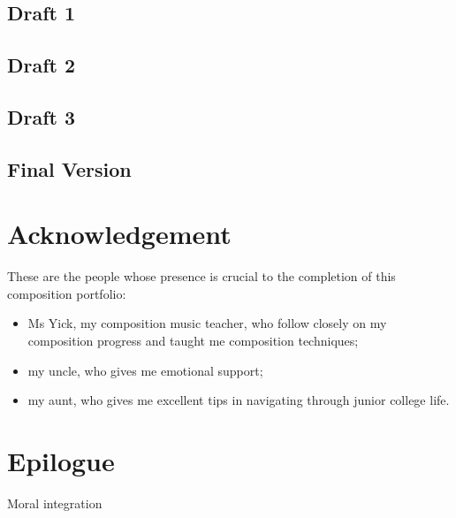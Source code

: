 \documentclass{article}
\begin{document}
\newpage
\begin{center}
\vspace*{\fill}
\LARGE
\subsection{Draft 1}
\vspace*{\fill}
%
\end{center}
\newpage
\begin{center}
\vspace*{\fill}
\LARGE
\subsection{Draft 2}
\vspace*{\fill}
%
\end{center}
\newpage
\begin{center}
\vspace*{\fill}
\LARGE
\subsection{Draft 3}
\vspace*{\fill}
%
\end{center}
\newpage
\begin{center}
\vspace*{\fill}
\LARGE
\subsection{Final Version}
\vspace*{\fill}
%
\end{center}


\section{Acknowledgement}
These are the people whose presence is crucial to the completion of this composition portfolio:
\begin{itemize}
    \item Ms Yick, my composition music teacher, who follow closely on my composition progress and taught me composition techniques;
    \item my uncle, who gives me emotional support;
    \item my aunt, who gives me excellent tips in navigating through junior college life.
\end{itemize}
\section{Epilogue}
Moral integration
\end{document}
